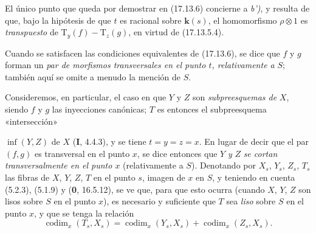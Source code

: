 El único punto que queda por demostrar en (17.13.6) concierne a \emph{b')}, y resulta de que, bajo la hipótesis de que $t$ es racional sobre $\boldsymbol k(s)$, el homomorfismo $\rho\otimes1$ es \emph{transpuesto} de $\mathrm{T}_y(f)-\mathrm{T}_z(g)$, en virtud de (17.13.5.4).

Cuando se satisfacen las condiciones equivalentes de (17.13.6), se dice que $f$ y $g$ forman un \emph{par de morfismos transversales en el punto $t$, relativamente a} $S$; también aquí se omite a menudo la mención de $S$.

\begin{env}[17.13.7]
\label{IV.17.13.7}
Consideremos, en particular, el caso en que $Y$ y $Z$ son \emph{subpreesquemas de} $X$, siendo $f$ y $g$ las inyecciones canónicas; $T$ es entonces el subpreesquema «intersección»


$\inf(Y,Z)$ de $X$ (\textbf I, 4.4.3), y se tiene $t=y=z=x$. En lugar de decir que el par $(f,g)$ es transversal en el punto $x$, se dice entonces que $Y$ \emph{y} $Z$ \emph{se cortan transversalmente en el punto $x$} (relativamente a $S$). Denotando por $X_s$, $Y_s$, $Z_s$, $T_s$ las fibras de $X$, $Y$, $Z$, $T$ en el punto $s$, imagen de $x$ en $S$, y teniendo en cuenta (5.2.3), (5.1.9) y (\textbf 0, 16.5.12), se ve que, para que esto ocurra (cuando $X$, $Y$, $Z$ son lisos sobre $S$ en el punto $x$), es necesario y suficiente que $T$ sea \emph{liso} sobre $S$ en el punto $x$, y que se tenga la relación
\[
\label{IV.17.13.7.1}
\tag{17.13.7.1}
\operatorname{codim}_x(T_s,X_s)=\operatorname{codim}_x(Y_s,X_s)+\operatorname{codim}_x(Z_s,X_s).
\]
\end{env}

